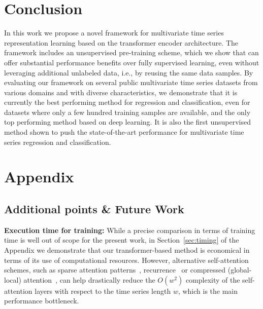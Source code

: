 \documentclass{article} \usepackage{iclr2021_conference,times}
\begin{document}
\section{Conclusion}

In this work we propose a novel framework for multivariate time series representation learning based on the transformer encoder architecture. The framework includes an unsupervised pre-training scheme, which we show that can offer substantial performance benefits over fully supervised learning, even without leveraging additional unlabeled data, i.e., by reusing the same data samples. By evaluating our framework on several public multivariate time series datasets from various domains and with diverse characteristics, we demonstrate that it is currently the best performing method for regression and classification, even for datasets where only a few hundred training samples are available, and the only top performing method based on deep learning. It is also the first unsupervised method shown to push the state-of-the-art performance for multivariate time series regression and classification.









\appendix
\section{Appendix}


\subsection{Additional points \& Future Work}

\textbf{Execution time for training:} While a precise comparison in terms of training time is well out of scope for the present work, in Section~\ref{sec:timing} of the Appendix we demonstrate that our transformer-based method is economical in terms of its use of computational resources. However, alternative self-attention schemes, such as sparse attention patterns~\citep{li2019enhancing}, recurrence~\citep{dai_transformer-xl_2019} or compressed (global-local) attention~\citep{beltagy_longformer_2020}, can help drastically reduce the $O(w^2)$ complexity of the self-attention layers with respect to the time series length $w$, which is the main performance bottleneck.
\end{document}
